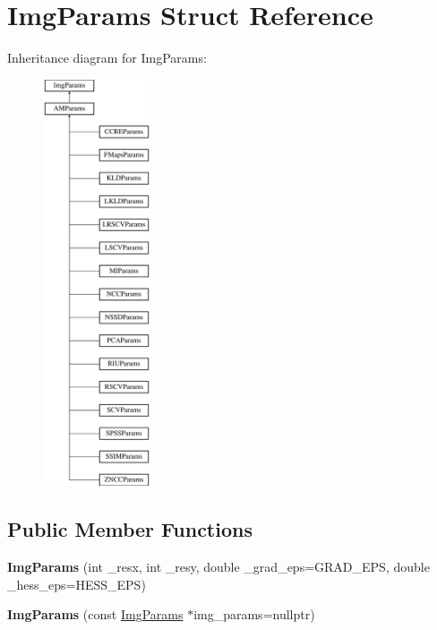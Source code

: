 \hypertarget{structImgParams}{\section{Img\-Params Struct Reference}
\label{structImgParams}
}
Inheritance diagram for Img\-Params\-:\begin{figure}[H]
\begin{center}
\leavevmode
\includegraphics[height=12.000000cm]{structImgParams}
\end{center}
\end{figure}
\subsection*{Public Member Functions}
\begin{DoxyCompactItemize}
\item 
\hypertarget{structImgParams_a49c741a4b827149c83af1512dc04e4a9}{{\bfseries Img\-Params} (int \-\_\-resx, int \-\_\-resy, double \-\_\-grad\-\_\-eps=G\-R\-A\-D\-\_\-\-E\-P\-S, double \-\_\-hess\-\_\-eps=H\-E\-S\-S\-\_\-\-E\-P\-S)}\label{structImgParams_a49c741a4b827149c83af1512dc04e4a9}

\item 
\hypertarget{structImgParams_a68e627bc2215ae75efce0043d012f215}{{\bfseries Img\-Params} (const \hyperlink{structImgParams}{Img\-Params} $\ast$img\-\_\-params=nullptr)}\label{structImgParams_a68e627bc2215ae75efce0043d012f215}

\end{DoxyCompactItemize}
